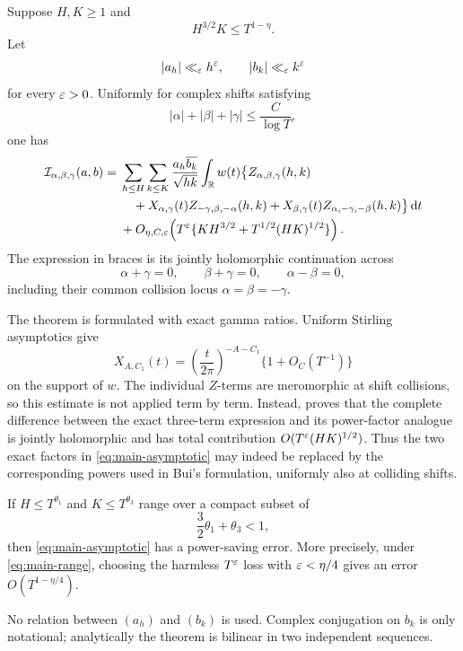 \begin{theorem}
\label{thm:main}
Suppose $H,K\geq1$ and
\begin{equation}\label{eq:main-range}
                         H^{3/2}K\leq T^{1-\eta}.
\end{equation}
Let
\begin{equation}\label{eq:coeff-bounds}
             |a_h|\ll_\varepsilon h^\varepsilon,\qquad
             |b_k|\ll_\varepsilon k^\varepsilon
\end{equation}
for every $\varepsilon>0$.  Uniformly for complex shifts satisfying
\begin{equation}\label{eq:shift-range}
              |\alpha|+|\beta|+|\gamma|\leq \frac{C}{\log T},
\end{equation}
one has
\begin{align}
 \mathcal I_{\alpha,\beta,\gamma}(a,b)
 ={}&\sum_{h\leq H}\sum_{k\leq K}
 \frac{a_h\overline{b_k}}{\sqrt{hk}}
 \int_{\mathbb R}w(t)\bigl\{
 Z_{\alpha,\beta,\gamma}(h,k) \notag\\
 &\quad+X_{\alpha,\gamma}(t)
 Z_{-\gamma,\beta,-\alpha}(h,k)
 +X_{\beta,\gamma}(t)
 Z_{\alpha,-\gamma,-\beta}(h,k)
 \bigr\}\,\mathrm d t \notag\\
 &+O_{\eta,C,\varepsilon}\!\left(
 T^\varepsilon\{KH^{3/2}+T^{1/2}(HK)^{1/2}\}\right).
 \label{eq:main-asymptotic}
\end{align}
The expression in braces is its jointly holomorphic continuation across
\[
 \alpha+\gamma=0,\qquad \beta+\gamma=0,\qquad \alpha-\beta=0,
\]
including their common collision locus $\alpha=\beta=-\gamma$.
\end{theorem}

The theorem is formulated with exact gamma ratios.  Uniform Stirling
asymptotics give
\begin{equation}\label{eq:X-stirling}
 X_{A,C_1}(t)=\left(\frac{t}{2\pi}\right)^{-A-C_1}
                     \{1+O_C(T^{-1})\}
\end{equation}
on the support of $w$.  The individual $Z$-terms are meromorphic at shift
collisions, so this estimate is not applied term by term.  Instead,
 proves that the complete difference
between the exact three-term expression and its power-factor analogue is
jointly holomorphic and has total contribution
$O(T^\varepsilon(HK)^{1/2})$.  Thus the two exact factors in
\eqref{eq:main-asymptotic} may indeed be replaced by the corresponding powers
used in Bui's formulation, uniformly also at colliding shifts.

\begin{corollary}\label{cor:exponent-region}
If $H\leq T^{\theta_1}$ and $K\leq T^{\theta_3}$ range over a compact subset
of
\[
                         \frac32\theta_1+\theta_3<1,
\]
then \eqref{eq:main-asymptotic} has a power-saving error.  More precisely,
under \eqref{eq:main-range}, choosing the harmless $T^\varepsilon$ loss with
$\varepsilon<\eta/4$ gives an error $O(T^{1-\eta/4})$.
\end{corollary}

\begin{remark}\label{rem:independent}
No relation between $(a_h)$ and $(b_k)$ is used.  Complex conjugation on
$b_k$ is only notational; analytically the theorem is bilinear in two
independent sequences.
\end{remark}
